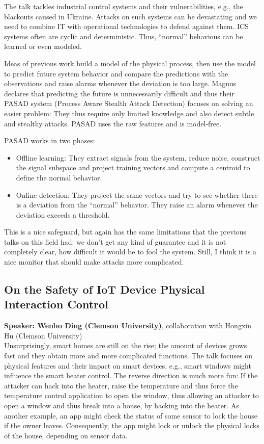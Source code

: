 \documentclass{article}
\begin{document}
The talk tackles industrial control systems and their vulnerabilities, e.g., the blackouts caused in Ukraine. Attacks on such systems can be devastating and we need to combine IT with operational technologies to defend against them.
ICS systems often are cyclic and deterministic. Thus, ``normal'' behavious can be learned or even modeled. 

Ideas of previous work build a model of the physical process, then use the model to predict future system behavior and compare the predictions with the observations and raise alarms whenever the deviation is too large. Magnus declares that predicting the future is unnecessarily difficult and thus their PASAD system (Process Aware Stealth Attack Detection) focuses on solving an easier problem: They thus require only limited knowledge and also detect subtle and stealthy attacks.
PASAD uses the raw features and is model-free. 

PASAD works in two phases:\begin{itemize}
	\item Offline learning: They extract signals from the system, reduce noise, construct the signal subspace and project training vectors and compute a centroid to define the normal behavior.
	\item Online detection: They project the same vectors and try to see whether there is a deviation from the ``normal'' behavior. They raise an alarm whenever the deviation exceeds a threshold.
\end{itemize}

This is a nice safeguard, but again has the same limitations that the previous talks on this field had: we don't get any kind of guarantee and it is not completely clear, how difficult it would be to fool the system. Still, I think it is a nice monitor that should make attacks more complicated.

\subsection{On the Safety of IoT Device Physical Interaction Control}
\noindent\textbf{Speaker: Wenbo Ding (Clemson University)}, collaboration with Hongxin Hu (Clemson University)\\

Unsurprisingly, smart homes are still on the rise; the amount of devices grows fast and they obtain more and more complicated functions. The talk focuses on physical features and their impact on smart devices, e.g., smart windows might influence the smart heater control. The reverse direction is much more fun: If the attacker can hack into the heater, raise the temperature and thus force the temperature control application to open the window, thus allowing an attacker to open a window and thus break into a house, by hacking into the heater. As another example, an app might check the status of some sensor to lock the house if the owner leaves. Consequently, the app might lock or unlock the physical locks of the house, depending on sensor data.
\end{document}
